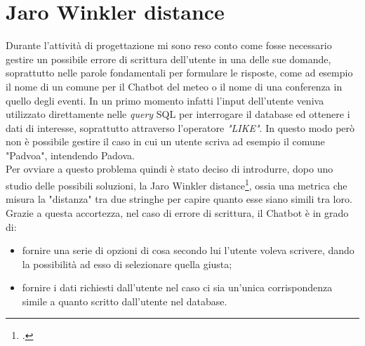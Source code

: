\section{Jaro Winkler distance}
Durante l'attività di progettazione mi sono reso conto come fosse necessario gestire un possibile errore di scrittura dell'utente in una delle sue domande, soprattutto nelle parole fondamentali per formulare le risposte, come ad esempio il nome di un comune per il \gls{Chatbot} del meteo o il nome di una conferenza in quello degli eventi. In un primo momento infatti l'input dell'utente veniva utilizzato direttamente nelle \emph{query} \gls{SQL} per interrogare il database ed ottenere i dati di interesse, soprattutto attraverso l'operatore \emph{"LIKE"}. In questo modo però non è possibile gestire il caso in cui un utente scriva ad esempio il comune "Padvoa", intendendo Padova. \\
Per ovviare a questo problema quindi è stato deciso di introdurre, dopo uno studio delle possibili soluzioni, la Jaro Winkler distance\footcite{jaro}, ossia una metrica che misura la "distanza" tra due stringhe per capire quanto esse siano simili tra loro. Grazie a questa accortezza, nel caso di errore di scrittura, il \gls{Chatbot} è in grado di:
\begin{itemize}
	\item fornire una serie di opzioni di cosa secondo lui l'utente voleva scrivere, dando la possibilità ad esso di selezionare quella giusta;
	\item fornire i dati richiesti dall'utente nel caso ci sia un'unica corrispondenza simile a quanto scritto dall'utente nel database.
\end{itemize}
